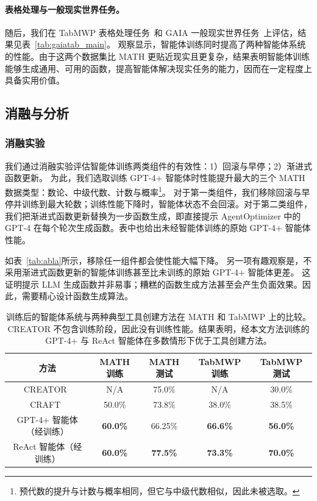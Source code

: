 \documentclass{article}
\begin{document}
\paragraph{表格处理与一般现实世界任务。}
随后，我们在 TabMWP 表格处理任务~\cite{lu2023dynamic}和 GAIA 一般现实世界任务~\cite{mialon2023gaia}上评估，结果见表~\ref{tab:gaiatab_main}。
观察显示，智能体训练同时提高了两种智能体系统的性能。由于这两个数据集比 MATH 更贴近现实且更复杂，结果表明智能体训练能够生成通用、可用的函数，提高智能体解决现实任务的能力，因而在一定程度上具备实用价值。

\subsection{消融与分析}
\label{sec_analysis}

\subsubsection{消融实验}

我们通过消融实验评估智能体训练两类组件的有效性：1）回滚与早停；2）渐进式函数更新。
为此，我们选取训练 GPT-4+ 智能体时性能提升最大的三个 MATH 数据类型：数论、中级代数、计数与概率\footnote{预代数的提升与计数与概率相同，但它与中级代数相似，因此未被选取。}。
对于第一类组件，我们移除回滚与早停并训练到最大轮数；训练性能下降时，智能体状态不会回滚。对于第二类组件，我们把渐进式函数更新替换为一步函数生成，即直接提示 AgentOptimizer 中的 GPT-4 在每个轮次生成函数。表中也给出未经智能体训练的原始 GPT-4+ 智能体性能。

如表~\ref{tab:abla}所示，移除任一组件都会使性能大幅下降。
另一项有趣观察是，不采用渐进式函数更新的智能体训练甚至比未训练的原始 GPT-4+ 智能体更差。
这证明提示 LLM 生成函数并非易事；糟糕的函数生成方法甚至会产生负面效果。因此，需要精心设计函数生成算法。

\begin{table}[!t]
\centering
\setlength{\tabcolsep}{8pt}
\renewcommand{\arraystretch}{0.95}
\begin{tabular}{ccccc}
\toprule[1.5pt]
\textbf{方法} & MATH 训练 & MATH 测试 & TabMWP 训练 & TabMWP 测试 \\ \hline
CREATOR~\cite{qian2023creator} & N/A & 75.0\% & N/A & 30.0\% \\
CRAFT~\cite{yuan2023craft} & 50.0\% & 73.8\% & 38.0\% & 38.5\% \\
\hline
\rowcolor[gray]{0.9} GPT-4+ 智能体（经训练） & \textbf{60.0\%} & 66.25\% & \textbf{66.6\%} & \textbf{56.0\%} \\
\rowcolor[gray]{0.9} ReAct 智能体（经训练） & \textbf{60.0\%} & \textbf{77.5\%} & \textbf{73.3\%} & \textbf{70.0\%} \\
\bottomrule[1.5pt]
\end{tabular}
\caption{训练后的智能体系统与两种典型工具创建方法在 MATH 和 TabMWP 上的比较。CREATOR 不包含训练阶段，因此没有训练性能。结果表明，经本文方法训练的 GPT-4+ 与 ReAct 智能体在多数情形下优于工具创建方法。}
\label{compare_with_tools}
\end{table}
\end{document}
